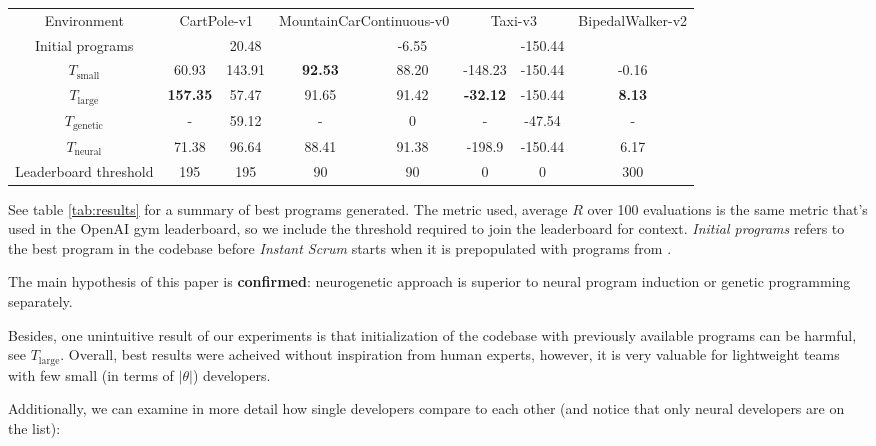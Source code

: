 \begin{table*}[]
    \centering
    \begin{tabular}{c|c|c|c|c|c|c|c}
         Environment & \multicolumn{2}{c}{CartPole-v1} & \multicolumn{2}{c}{MountainCarContinuous-v0} & \multicolumn{2}{c}{Taxi-v3} & BipedalWalker-v2 \\
         Initial programs & & 20.48 & & -6.55 & & -150.44 & \\
         \midrule
         $T_\text{small}$  &    60.93 &    143.91 &     \textbf{92.53} &     88.20 &   -148.23 &   -150.44 &     -0.16\\
         $T_\text{large}$ & \textbf{157.35} &     57.47 &     91.65 &     91.42 &    \textbf{-32.12} &   -150.44 &      \textbf{8.13} \\ 
         $T_\text{genetic}$& - & 59.12 & - & 0 & - & -47.54 & - \\ 
         $T_\text{neural}$ & 71.38 & 96.64 & 88.41 & 91.38 & -198.9 & -150.44 & 6.17 \\
         \midrule
         Leaderboard threshold & 195 & 195 & 90 & 90 & 0 & 0 & 300 \\ 
    \end{tabular}
    \caption{Averaged 100-episode reward acheived by the best program in each category}
    \label{tab:results}
\end{table*}

See table \ref{tab:results} for a summary of best programs generated.
The metric used, average $R$ over 100 evaluations is the same metric that's used in the OpenAI gym leaderboard, so we include the threshold required to join the leaderboard for context.
\emph{Initial programs} refers to the best program in the codebase before \emph{Instant Scrum} starts when it is prepopulated with  programs from \cite{bf++}.

The main hypothesis of this paper is \textbf{confirmed}: neurogenetic approach is superior to neural program induction or genetic programming separately.

Besides, one unintuitive result of our experiments is that initialization of the codebase with previously available programs can be harmful, see $T_\text{large}$.
Overall, best results were acheived without inspiration from human experts, however, it is very valuable for lightweight teams with few small (in terms of $|\theta|$) developers.

Additionally, we can examine in more detail how single developers compare to each other (and notice that only neural developers are on the list): 

